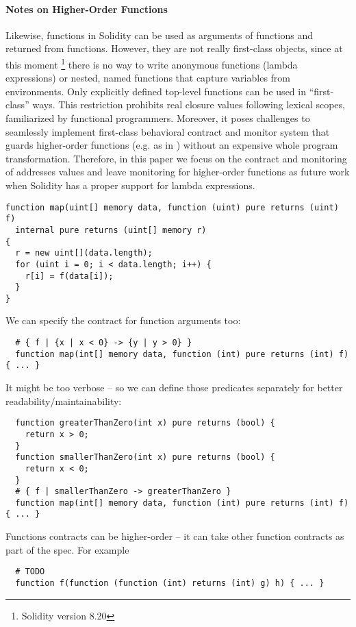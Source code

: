 \paragraph{Notes on Higher-Order Functions}
Likewise, functions in Solidity can be used as arguments of functions and returned from
functions.
However, they are not really first-class objects, since at this moment
\footnote{Solidity version 8.20} there is no way to write anonymous functions
(lambda expressions) or nested, named functions that capture variables from
environments.
Only explicitly defined top-level functions can be used in ``first-class''
ways.
This restriction prohibits real closure values following lexical scopes,
familiarized by functional programmers.
Moreover, it poses challenges to seamlessly implement first-class behavioral
contract and monitor system that guards higher-order functions (e.g. as in
\cite{DBLP:conf/icfp/FindlerF02}) without an expensive whole program
transformation.
Therefore, in this paper we focus on the contract and monitoring of addresses
values and leave monitoring for higher-order functions as future work when
Solidity has a proper support for lambda expressions.

\iffalse
	\begin{lstlisting}
function map(uint[] memory data, function (uint) pure returns (uint) f)
  internal pure returns (uint[] memory r)
{
  r = new uint[](data.length);
  for (uint i = 0; i < data.length; i++) {
    r[i] = f(data[i]);
  }
}
\end{lstlisting}

We can specify the contract for function arguments too:
\begin{lstlisting}
  # { f | {x | x < 0} -> {y | y > 0} }
  function map(int[] memory data, function (int) pure returns (int) f) { ... }
\end{lstlisting}
It might be too verbose -- so we can define those predicates separately for better readability/maintainability:
\begin{lstlisting}
  function greaterThanZero(int x) pure returns (bool) {
    return x > 0;
  }
  function smallerThanZero(int x) pure returns (bool) {
    return x < 0;
  }
  # { f | smallerThanZero -> greaterThanZero }
  function map(int[] memory data, function (int) pure returns (int) f) { ... }
\end{lstlisting}

Functions contracts can be higher-order --
it can take other function contracts
as part of the spec. For example
\begin{lstlisting}
  # TODO
  function f(function (function (int) returns (int) g) h) { ... }
\end{lstlisting}

